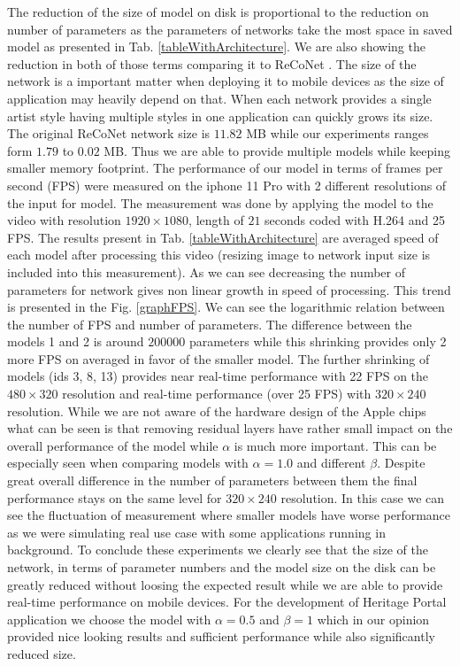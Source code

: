 \documentclass[a4paper,conference]{IEEEtran}
\newcommand{\ResidualLayerNumber}{\beta}
\begin{document}
The reduction of the size of model on disk is proportional to the reduction on number of parameters as the parameters of networks take the most space in saved model as presented in Tab. \ref{tableWithArchitecture}. We are also showing the reduction in both of those terms comparing it to ReCoNet \cite{Reconet}. The size of the network is a important matter when deploying it to mobile devices as the size of application may heavily depend on that. When each network provides a single artist style having multiple styles in one application can quickly grows its size. The original ReCoNet network size is $11.82$ MB while our experiments ranges form $1.79$ to $0.02$ MB. Thus we are able to provide multiple models while keeping smaller memory footprint. The performance of our model in terms of frames per second (FPS) were measured on the iphone 11 Pro with 2 different resolutions of the input for model. The measurement was done by applying the model to the video with resolution $1920\times1080$, length of $21$ seconds coded with H.264 and 25 FPS. The results present in Tab. \ref{tableWithArchitecture} are averaged speed of each model after processing this video (resizing image to network input size is included into this measurement). As we can see decreasing the number of parameters for network gives non linear growth in speed of processing. This trend is presented in the Fig. \ref{graphFPS}. We can see the logarithmic relation between the number of FPS and number of parameters. The difference between the models  1 and  2 is around $200 000$ parameters while this shrinking provides only 2 more FPS on averaged in favor of the smaller model. The further shrinking of models (ids 3, 8, 13) provides near real-time performance with 22 FPS on the $480\times320$ resolution and real-time performance (over 25 FPS) with $320\times240$ resolution. While we are not aware of the hardware design of the Apple chips what can be seen is that removing residual layers have rather small impact on the overall performance of the model while $\alpha$ is much more important. This can be especially seen when comparing models with $\alpha=1.0$ and different $\ResidualLayerNumber$. Despite great overall difference in the number of parameters between them the final performance stays on the same level for $320\times240$ resolution. In this case we can see the fluctuation of measurement where smaller models have worse performance as we were simulating real use case with some applications running in background. To conclude these experiments we clearly see that the size of the network, in terms of parameter numbers and the model size on the disk can be greatly reduced without loosing the expected result while we are able to provide real-time performance on mobile devices.  For the development of Heritage Portal application we choose the model with  $\alpha=0.5$ and $\ResidualLayerNumber=1$ which in our opinion provided nice looking results and sufficient performance while also significantly reduced size.
\end{document}
